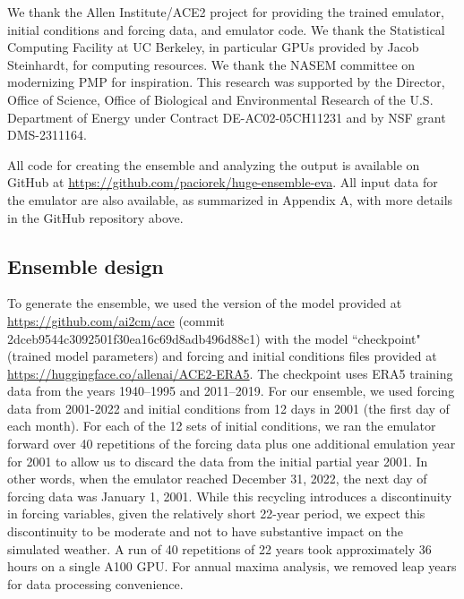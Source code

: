 \documentclass{ametsocV6.1}
\begin{document}
\clearpage
\acknowledgments
We thank the Allen Institute/ACE2 project for providing the trained emulator, initial conditions and forcing data, and emulator code. We thank the Statistical Computing Facility at UC Berkeley, in particular GPUs provided by Jacob Steinhardt, for computing resources. We thank the  NASEM committee on modernizing PMP for inspiration. This research was supported by the Director, Office of Science, Office of Biological and Environmental Research of the U.S. Department of Energy under Contract DE-AC02-05CH11231 and by NSF grant DMS-2311164.

\datastatement
All code for creating the ensemble and analyzing the output is available on GitHub at \url{https://github.com/paciorek/huge-ensemble-eva}.
All input data for the emulator are also available, as summarized in Appendix A, with more details in the GitHub repository above.




    

\appendix[A] 
\label{app-methods}

\subsection*{Ensemble design}
\label{app:design}


To generate the ensemble, we used the version of the model provided at \url{https://github.com/ai2cm/ace} (commit 2dceb9544c3092501f30ea16c69d8adb496d88c1) with the model ``checkpoint" (trained model parameters) and forcing and initial conditions files provided at \url{https://huggingface.co/allenai/ACE2-ERA5}. The checkpoint uses ERA5 training data from the years 1940–1995 and 2011–2019. For our ensemble, we used forcing data from 2001-2022 and initial conditions from 12 days in 2001 (the first day of each month). For each of the 12 sets of initial conditions, we ran the emulator forward over 40 repetitions of the forcing data plus one additional emulation year for 2001 to allow us to discard the data from the initial partial year 2001. In other words, when the emulator reached December 31, 2022, the next day of forcing data was January 1, 2001. While this recycling introduces a discontinuity in forcing variables, given the relatively short 22-year period, we expect this discontinuity to be moderate and not to have substantive impact on the simulated weather. A run of 40 repetitions of 22 years took approximately 36 hours on a single A100 GPU.  For annual maxima analysis, we removed leap years for data processing convenience.
\end{document}
